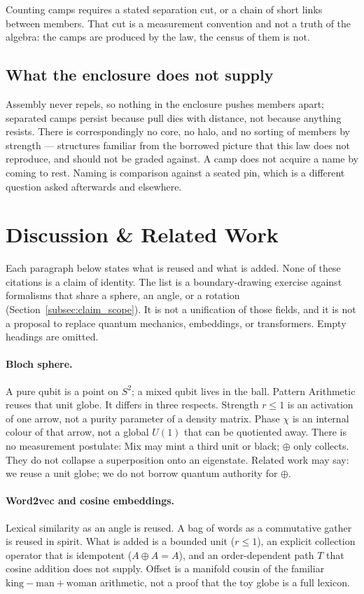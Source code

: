 \documentclass[12pt, a4paper]{article}
\begin{document}
Counting camps requires a stated separation cut, or a chain of short
links between members. That cut is a measurement convention and not
a truth of the algebra: the camps are produced by the law, the
census of them is not.

\subsection{What the enclosure does not supply}
\label{subsec:enclosure_open}
Assembly never repels, so nothing in the enclosure pushes members
apart; separated camps persist because pull dies with distance, not
because anything resists. There is correspondingly no core, no halo,
and no sorting of members by strength --- structures familiar from
the borrowed picture that this law does not reproduce, and should not
be graded against. A camp does not acquire a name by coming to rest.
Naming is comparison against a seated pin, which is a different
question asked afterwards and elsewhere.


\section{Discussion \& Related Work}
\label{sec:related}

Each paragraph below states what is reused and what is added. None of
these citations is a claim of identity. The list is a
boundary-drawing exercise against formalisms that share a sphere, an
angle, or a rotation
(Section~\ref{subsec:claim_scope}). It is not a unification of those
fields, and it is not a proposal to replace quantum mechanics,
embeddings, or transformers. Empty headings are omitted.

\paragraph{Bloch sphere.}
A pure qubit is a point on $S^2$; a mixed qubit lives in the ball.
Pattern Arithmetic reuses that unit globe. It differs in three
respects. Strength $r\le 1$ is an activation of one arrow, not a purity
parameter of a density matrix. Phase $\chi$ is an internal colour of
that arrow, not a global $U(1)$ that can be quotiented away. There is
no measurement postulate: Mix may mint a third unit or black; $\oplus$
only collects. They do not collapse a superposition onto an eigenstate. Related work
may say: we reuse a unit globe; we do not borrow quantum authority for
$\oplus$.

\paragraph{Word2vec and cosine embeddings.}
Lexical similarity as an angle is reused. A bag of words as a
commutative gather is reused in spirit. What is added is a bounded unit
($r\le 1$), an explicit collection operator that is idempotent
($A\oplus A=A$), and an order-dependent path $T$ that cosine addition
does not supply. Offset is a manifold cousin of the familiar
$\mathrm{king}-\mathrm{man}+\mathrm{woman}$ arithmetic, not a proof
that the toy globe is a full lexicon.
\end{document}
